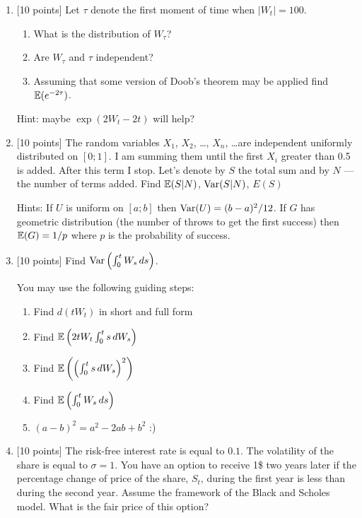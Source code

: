 \documentclass[pdftex,12pt,a4paper]{article}
\begin{document}
\begin{enumerate}


\item $[$10 points] Let $\tau$ denote the first moment of time when $|W_t|=100$. 
\begin{enumerate}
\item What is the distribution of $W_{\tau}$?
\item Are $W_{\tau}$ and $\tau$ independent?
\item Assuming that some version of Doob's theorem may be applied find $\mathbb{E}(e^{-2\tau})$. 
\end{enumerate}
Hint: maybe $\exp(2 W_t - 2 t )$ will help?


\item $[$10 points] The random variables $X_1$, $X_2$, \ldots, $X_n$, \ldots are independent uniformly distributed on $[0; 1]$. I am summing them until the first $X_i$ greater than 0.5 is added. After this term I stop. Let’s denote by $S$ the total sum and by $N$ --- the number of terms added. Find $\mathbb{E}(S|N)$, $\operatorname{Var}(S|N)$, $E(S)$ %

Hints: If $U$ is uniform on $[a;b]$ then $\operatorname{Var}(U)=(b-a)^2/12$. If $G$ has geometric distribution (the number of throws to get the first success) then $\mathbb{E}(G)=1/p$  where $p$  is the probability of success.

\item $[$10 points] Find $\operatorname{Var}\left(  \int_0^t W_s \, ds  \right)$. 

You may use the following guiding steps:

\begin{enumerate}
\item Find $d(tW_t)$ in short and full form
\item Find $\mathbb{E}\left(2t W_t\int_0^t s \, dW_s\right)$
\item Find $\mathbb{E}\left(\left(\int_0^t s \, dW_s\right)^2 \right)$
\item Find $\mathbb{E}\left(  \int_0^t W_s \, ds  \right)$
\item $(a-b)^2=a^2-2ab+b^2$ :)
\end{enumerate}

\item $[$10 points] The risk-free interest rate is equal to $0.1$. The volatility of the share is equal to $\sigma=1$. You have an option to receive 1\$ two years later if the percentage change of price of the share, $S_t$, during the first year is less than during the second year. Assume the framework of the Black and Scholes model. What is the fair price of this option?


\end{enumerate}
\end{document}
